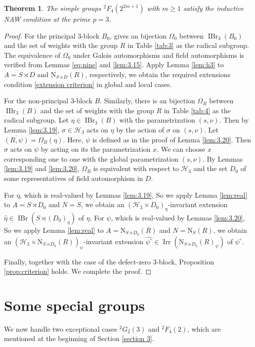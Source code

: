 \documentclass[11pt,a4paper]{article}
\numberwithin{equation}{section}
\newtheorem{theorem}{Theorem}[section]
\theoremstyle{definition}
\theoremstyle{remark}
\newcommand{\Irr}{\operatorname{Irr}}
\newcommand{\IBr}{\operatorname{IBr}}
\newcommand{\HH}{\mathcal H}
\newcommand{\NN}{\mathrm N}
\begin{document}
\begin{theorem}\label{thm:2F4-p=3}
The simple groups ${}^2F_4(2^{2m+1})$ with $m\geq 1$  satisfy the inductive NAW condition at the prime $p=3$.
\end{theorem}
\begin{proof}
For the principal $3$-block $B_0$, \cite[Theorem 5.1]{Malle} gives
an bijection $\Omega_0$ between $\IBr_3(B_0)$ and the set of weights with the group $R$ in Table \ref{tab:3} as the radical subgroup. The equivalence of $\Omega_0$ under Galois automorphisms and field automorphisms is  verified from Lemmas \ref{eq:nine} and \ref{lem:3.15}. Apply Lemma \ref{lem:h3} to $A=S\rtimes D$ and $\NN_{S\rtimes D}(R)$, respectively, we obtain the required extensions condition \eqref{extension criterion} in global and local cases.

For the non-principal $3$-block $B$. Similarly, there is an bijection $\Omega_B$ between $\IBr_3(B)$ and the set of weights with the group $R$ in Table \ref{tab:4} as the radical subgroup.
Let $\eta\in\IBr_3(B)$ with the parametrization  $(s,\nu)$. Then by Lemma \ref{lem:3.19}, $\sigma\in\HH_3$ acts on $\eta$ by the action of $\sigma$ on $(s,\nu)$. Let $\overline{(R,\psi)}=\Omega_B(\eta)$. Here, $\psi$ is defined as in the proof of Lemma \ref{lem:3.20}. Then $\sigma$ acts on $\psi$ by acting on its the parametrization $x$. We can choose $x$ corresponding one to one with the global parametrization $(s,\nu)$.
By Lemmas \ref{lem:3.19} and \ref{lem:3.20}, $\Omega_B$ is
equivalent with respect to $\HH_3$ and  the set $D_0$ of some representatives of field automorphism in $D$. 

For $\eta$, which is real-valued by Lemmas \ref{lem:3.19},
So we apply Lemma \ref{lem:real} to $A=S\rtimes D_0$ and $N=S$, we obtain an $(\HH_3\times D_0)_\eta$-invariant extension $\widehat \eta\in\IBr(S\rtimes (D_0)_\eta)$ of $\eta$. For $\psi$, which is real-valued by Lemmas \ref{lem:3.20},
So we apply Lemma \ref{lem:real} to $A=\NN_{S\rtimes D_0}(R)$ and $N=\NN_S(R)$, we obtain an $(\HH_3\times \NN_{S\rtimes D_0}(R))_\psi$-invariant extension  $\widehat{\psi^\circ}\in\Irr(\NN_{S\rtimes D_0}(R)_\psi)$ of $\psi^\circ$.

Finally, together with the case of the defect-zero $3$-block, Proposition \ref{prop:criterion} holds. We complete the proof.
\end{proof}






\section{Some special groups}\label{section 4}
We now handle two exceptional cases ${}^2G_2(3)$ and ${}^2F_4(2)$, which are mentioned at the beginning of Section \ref{section 3}.
\end{document}
